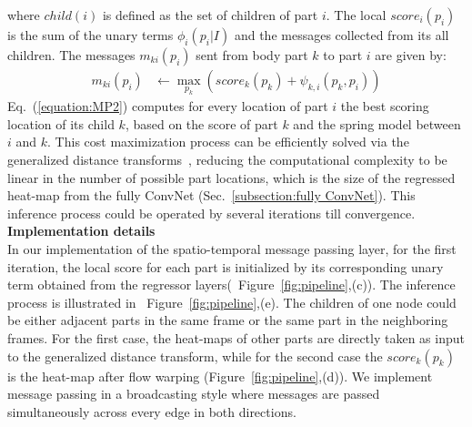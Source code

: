 \documentclass[10pt,twocolumn,letterpaper]{article}
\newcommand{\figref}[1]{Figure~\ref{#1}}
\newcommand{\secref}[1]{Sec.~\ref{#1}}
\newcommand{\refequ}[1]{Eq.~(\ref{#1})}
\begin{document}
where $child(i)$ is defined as the set of children of part $i$. The local $score_i(p_i)$ is the sum of the unary terms $\phi_i(p_i|I)$ and the messages collected from its all children. The messages $m_{ki}(p_i)$ sent from body part $k$ to part $i$ are given by:
\begin{equation}
\begin{aligned}
m_{ki}(p_i) &\leftarrow \max_{p_k}(score_k(p_k)+\psi_{k,i}(p_k, p_i))
\end{aligned}
\label{equation:MP2}
\end{equation}\refequ{equation:MP2} computes for every location of part $i$ the best scoring location of its child $k$, based on the score of part $k$ and the spring model between $i$ and $k$. This cost maximization process can be efficiently solved via the generalized distance transforms~\cite{felzenszwalb2004distance}, reducing the computational complexity to be linear in the number of possible part locations, which is the size of the regressed heat-map from the fully ConvNet (\secref{subsection:fully ConvNet}). This inference process could be operated by several iterations till convergence. \\

\noindent\textbf{Implementation details}\\
In our implementation of the spatio-temporal message passing layer, for the first iteration, the local score for each part is initialized by its corresponding unary term obtained from the regressor layers(~\figref{fig:pipeline},(c)). The inference process is illustrated in ~\figref{fig:pipeline},(e). The children of one node could be either adjacent parts in the same frame or the same part in the neighboring frames. For the first case, the heat-maps of other parts are directly taken as input to the generalized distance transform, while for the second case the $score_k(p_k)$ is the heat-map after flow warping (\figref{fig:pipeline},(d)).
We implement message passing in a broadcasting style where messages are passed simultaneously across every edge in both directions.
\end{document}
